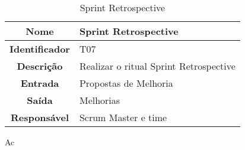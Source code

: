 {             \begin{table}[H]
                \centering
                \caption{Sprint Retrospective}
                \begin{tabular}{c|p{10cm}}
                    \hline
                    \textbf{Nome}            & Sprint Retrospective\\
                    \hline
                    \textbf{Identificador} & T07\\
                    \hline
                    \textbf{Descrição}   & Realizar o ritual Sprint Retrospective\\
                    \hline
                    \textbf{Entrada}           & Propostas de Melhoria\\
                    \hline
                    \textbf{Saída}            &  Melhorias\\
                    \hline
                    \textbf{Responsável}            & Scrum Master e  time \\
                    \hline
                \end{tabular}
            \end{table}
Ac
}
